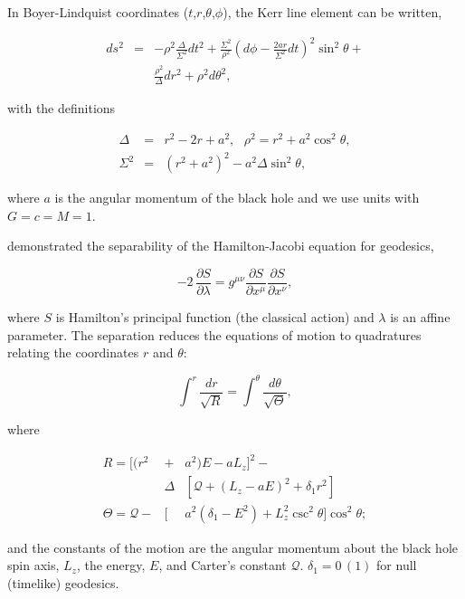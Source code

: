 \documentclass[apj]{emulateapj}
\begin{document}
 In Boyer-Lindquist coordinates ($t$,$r$,$\theta$,$\phi$), the Kerr line element can be written,

\begin{eqnarray}
\nonumber ds^2 &=& -\rho^2 \frac{\Delta}{\Sigma^2} dt^2 + \frac{\Sigma^2}{\rho^2}\left ( d\phi -\frac{2ar}{\Sigma^2}dt\right )^2\sin^2\theta+\\ 
 &&\frac{\rho^2}{\Delta}dr^2+\rho^2 d\theta^2,
\end{eqnarray}

\noindent with the definitions

\begin{eqnarray}
\Delta &=& r^2-2r+a^2, \hspace{8pt} \rho^2 = r^2+a^2\cos^2{\theta}, \\
\Sigma^2 &=& (r^2+a^2)^2-a^2\Delta \sin^2{\theta},
\end{eqnarray}

\noindent where $a$ is the angular momentum of the black hole and we use units with $G=c=M=1$.

\citet{carter68} demonstrated the separability of the Hamilton-Jacobi equation for geodesics,

\begin{equation}
  -2 \hspace{2pt}\frac{\partial S}{\partial \lambda} = g^{\mu \nu} \frac{\partial S}{\partial x^\mu}\frac{\partial S}{\partial x^\nu},
\end{equation}

\noindent where $S$ is Hamilton's principal function (the classical action) and $\lambda$ is an affine parameter. The separation reduces the equations of motion to quadratures \citep{chandrasekhar83} relating the coordinates $r$ and $\theta$:

\begin{equation}
\int^r \frac{dr}{\sqrt{R}} = \int^\theta \frac{d\theta}{\sqrt{\Theta}},
\end{equation}

\noindent where 

\begin{eqnarray}
R=[(r^2&+&a^2)E-aL_z]^2-\\\nonumber
  &\Delta&[\mathcal{Q}+(L_z-aE)^2+\delta_1 r^2]\\
\Theta=\mathcal{Q}-&[&a^2(\delta_1-E^2)+L_z^2 \csc^2 \theta ] \cos^2{\theta};
\end{eqnarray}

\noindent and the constants of the motion are the angular momentum about the black hole spin axis, $L_z$, the energy, $E$, and Carter's constant $\mathcal{Q}$. $\delta_1 = 0\hspace{2pt}(1)$ for null (timelike) geodesics.
\end{document}

